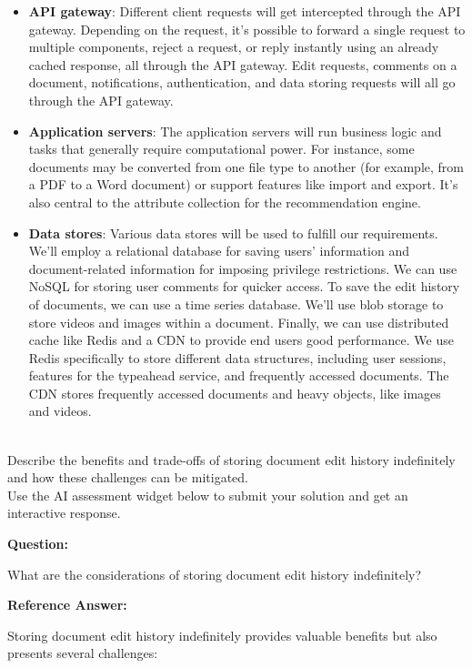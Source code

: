 \begin{itemize}
\item
\protect{}\label{Cl-NnnIhbArsg7VsPW4kO}
\textbf{API gateway}: Different client requests will get intercepted through the API gateway. Depending on the request, it's possible to forward a single request to multiple components, reject a request, or reply instantly using an already cached response, all through the API gateway. Edit requests, comments on a document, notifications, authentication, and data storing requests will all go through the API gateway.
\item
\protect{}\label{itDmxKQ9cacQschx0MH4Y}
\textbf{Application servers}: The application servers will run business logic and tasks that generally require computational power. For instance, some documents may be converted from one file type to another (for example, from a PDF to a Word document) or support features like import and export. It's also central to the attribute collection for the recommendation engine.
\item
\protect{}\label{TSGo8TB2kbyib3lhbBTCp}
\textbf{Data stores}: Various data stores will be used to fulfill our requirements. We'll employ a relational database for saving users' information and document-related information for imposing privilege restrictions. We can use NoSQL for storing user comments for quicker access. To save the edit history of documents, we can use a time series database. We'll use blob storage to store videos and images within a document. Finally, we can use distributed cache like Redis and a CDN to provide end users good performance. We use Redis specifically to store different data structures, including user sessions, features for the typeahead service, and frequently accessed documents. The CDN stores frequently accessed documents and heavy objects, like images and videos.
\end{itemize}
\\
Describe the benefits and trade-offs of storing document edit history indefinitely and how these challenges can be mitigated.
\\
Use the AI assessment widget below to submit your solution and get an interactive response.

\textbf{Question:}

What are the considerations of storing document edit history indefinitely?

\textbf{Reference Answer:}

Storing document edit history indefinitely provides valuable benefits but also presents several challenges:

